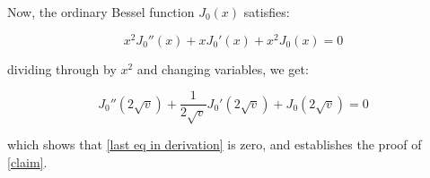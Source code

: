 \documentclass{article}
\begin{document}
Now, the ordinary Bessel function $J_0(x)$ satisfies:

\begin{equation*}
x^2 J_0''(x) + xJ_0'(x) + x^2J_0(x) = 0
\end{equation*}

dividing through by $x^2$ and changing variables, we get:

\begin{equation*}
J_0''(2\sqrt{v}) + \frac{1}{2\sqrt{v}}J_0'(2\sqrt{v}) + J_0(2\sqrt{v}) = 0
\end{equation*}

which shows that \eqref{last eq in derivation} is zero, and establishes the proof of \eqref{claim}.
\end{document}
